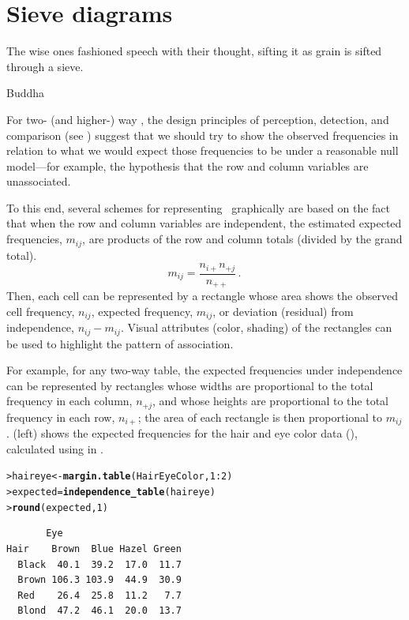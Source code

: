 \documentclass[10pt,krantz2]{krantz}\usepackage[]{graphicx}\usepackage[]{color}
\makeatletter
\newcommand{\hlnum}[1]{\textcolor[rgb]{0.686,0.059,0.569}{#1}}%
\newcommand{\hlopt}[1]{\textcolor[rgb]{0,0,0}{#1}}%
\newcommand{\hlstd}[1]{\textcolor[rgb]{0.345,0.345,0.345}{#1}}%
\newcommand{\hlkwb}[1]{\textcolor[rgb]{0.69,0.353,0.396}{#1}}%
\newcommand{\hlkwd}[1]{\textcolor[rgb]{0.737,0.353,0.396}{\textbf{#1}}}%
\newenvironment{kframe}{%
 \def\at@end@of@kframe{}%
 \ifinner\ifhmode%
  \def\at@end@of@kframe{\end{minipage}}%
  \begin{minipage}{\columnwidth}%
 \fi\fi%
 \def\FrameCommand##1{\hskip\@totalleftmargin \hskip-\fboxsep
 \colorbox{shadecolor}{##1}\hskip-\fboxsep
     \hskip-\linewidth \hskip-\@totalleftmargin \hskip\columnwidth}%
 \MakeFramed {\advance\hsize-\width
   \@totalleftmargin\z@ \linewidth\hsize
   \@setminipage}}%
 {\par\unskip\endMakeFramed%
 \at@end@of@kframe}
\newenvironment{knitrout}{}{} %
\renewenvironment{knitrout}{\small\renewcommand{\baselinestretch}{.85}}{} %
\makeatother
\begin{document}
\section{Sieve diagrams}\label{sec:twoway-sieve}

\epigraph{The wise ones fashioned speech with their thought, sifting it as grain is sifted through a sieve.}{Buddha}
For two- (and higher-) way \ctabs, the
design principles of
perception, detection, and comparison
(see )
suggest that we should try to show the observed frequencies
in relation to what we would expect those frequencies to be
under a reasonable null model---for example, the
hypothesis that the row and column variables are unassociated.

To this end, several schemes for representing \ctabs\
graphically are
based on the fact that when the row and column variables are
independent, the estimated expected frequencies, \(m_{ij}\), are
products of the row and column totals (divided by the grand total).
\begin{equation*}
 m_{ij} = \frac{ n_{i+} n_{+j} } { n_{++} }
 \period
\end{equation*}
Then, each cell can be represented by a rectangle whose area shows
the observed cell frequency, \(n_{ij}\),  expected frequency, \(m_{ij}\),
or deviation (residual) from independence, \(n_{ij} - m_{ij}\).
Visual attributes (color, shading) of the rectangles can be used to
highlight the pattern of association.


For example, for any two-way table, the expected frequencies under independence
can be represented by rectangles whose widths are proportional to the
total frequency in each column, \(n_{+j}\), and whose heights are
proportional to the total frequency in each row, \(n_{i+}\); the area
of each rectangle is then proportional to \(m_{ij}\).  (left)
shows the expected frequencies for the hair and eye color
data (), calculated using
 in .
\begin{knitrout}
\color{fgcolor}\begin{kframe}
\begin{alltt}
\hlstd{> }\hlstd{haireye} \hlkwb{<-} \hlkwd{margin.table}\hlstd{(HairEyeColor,} \hlnum{1}\hlopt{:}\hlnum{2}\hlstd{)}
\hlstd{> }\hlstd{expected} \hlkwb{=} \hlkwd{independence_table}\hlstd{(haireye)}
\hlstd{> }\hlkwd{round}\hlstd{(expected,} \hlnum{1}\hlstd{)}
\end{alltt}
\begin{verbatim}
       Eye
Hair    Brown  Blue Hazel Green
  Black  40.1  39.2  17.0  11.7
  Brown 106.3 103.9  44.9  30.9
  Red    26.4  25.8  11.2   7.7
  Blond  47.2  46.1  20.0  13.7
\end{verbatim}
\end{kframe}
\end{knitrout}
\end{document}
